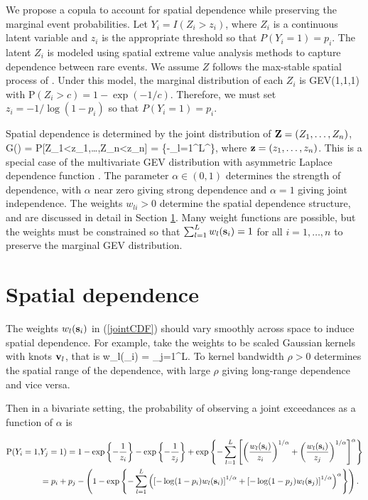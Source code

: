 \documentclass[11pt]{article}
\begin{document}
We propose a copula \citep{nelsen-1999} to account for spatial dependence while preserving the marginal event probabilities. Let $Y_i = I(Z_i>z_i)$, where $Z_i$ is a continuous latent variable and $z_i$ is the appropriate threshold so that $P(Y_i=1)=p_i$.  The latent $Z_i$ is modeled using spatial extreme value analysis methods to capture dependence between rare events.  We assume $Z$ follows the max-stable spatial process of \cite{reich-2012}.  Under this model, the marginal distribution of each $Z_i$ is GEV(1,1,1) with P$(Z_i>c) = 1-\exp(-1/c)$.  Therefore, we must set $z_i=-1/\log(1-p_i)$ so that $P(Y_i=1)=p_i$.

Spatial dependence is determined by the joint distribution of $\mbox{\bf Z} = (Z_1,\ldots,Z_n)$,
\beq\label{jointCDF}
 G(\bz) =  \mbox{P}[Z_1<z_1,\ldots,Z_n<z_n] = \exp\left\{-\sum_{l=1}^L\left[\sum_{i=1}^n\left(\frac{w_{l}(\bs_i)}{z_i}\right)^{1/\alpha}\right]^{\alpha}\right\},
\eeq
where $\mbox{\bf z} = (z_1,\ldots,z_n)$. This is a special case of the multivariate GEV distribution with asymmetric Laplace dependence function \citep{Tawn-1990}.  The parameter $\alpha\in(0,1)$ determines the strength of dependence, with $\alpha$ near zero giving strong dependence and $\alpha=1$ giving joint independence. The weights $w_{li}>0$ determine the spatial dependence structure, and are discussed in detail in Section \ref{s:spatial}.  Many weight functions are possible, but the weights must be constrained so that $\sum_{l=1}^L w_{l}(\mbox{\bf s}_i)=1$ for all $i=1,\ldots,n$ to preserve the marginal GEV distribution.

\section{Spatial dependence}\label{s:spatial}

The weights $w_{l}(\mbox{\bf s}_i)$ in (\ref{jointCDF}) should vary smoothly across space to induce spatial dependence.  For example, \cite{reich-2012} take the weights to be scaled Gaussian kernels with knots $\mbox{\bf v}_l$, that is
\beq\label{w}
   w_{l}(\bs_i) = 
                 {\sum_{j=1}^L\exp{}}.
\eeq
To kernel bandwidth $\rho>0$ determines the spatial range of the dependence, with large $\rho$ giving long-range dependence and vice versa.

Then in a bivariate setting, the probability of observing a joint exceedances as a function of $\alpha$ is

\begin{align} \label{biv}
  \text{P}(Y_i = 1, & Y_j = 1) = 1 - \exp\left\{ - \frac{ 1 }{ z_i } \right\} - \exp \left\{ - \frac{ 1 }{z_j} \right\} + \exp \left\{ - \sum_{ l = 1 }^{ L } \left[ \left( \frac{ w_{ l }(\mbox{\bf s}_i) }{ z_i } \right)^{1/\alpha} + \left( \frac{ w_{l }(\mbox{\bf s}_i)}{z_j} \right)^{1/\alpha} \right]^{\alpha} \right\} \nonumber \\
  		&= p_i + p_j - \left( 1 - \exp \left \{ - \sum_{ l = 1 }^{ L } \left( \left[ -\log(1-p_i) w_{l}(\mbox{\bf s}_i) \right]^{ 1/\alpha } + \left[ -\log(1 - p_j) w_{ l}(\mbox{\bf s}_j) \right]^{ 1/\alpha } \right)^{\alpha} \right \} \right).
\end{align}
\end{document}
